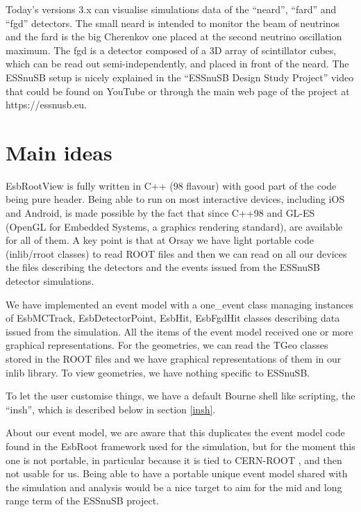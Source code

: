 \documentclass{webofc}
\begin{document}
Today's versions 3.x can visualise simulations data of the ``neard'',
``fard'' and ``fgd'' detectors. The small neard is intended to monitor the
beam of neutrinos and the fard is the big Cherenkov one
placed at the second neutrino oscillation maximum. The fgd is a detector
composed of a 3D array of scintillator cubes, which can be read out
semi-independently, and placed in front of the neard.
The ESSnuSB setup
is nicely explained in the ``ESSnuSB Design Study Project'' video that
could be found on YouTube or through the main web page of the project
at https://essnusb.eu.

\section{Main ideas}
EsbRootView is fully written in C++ (98 flavour) with good part of the code being
pure header. Being able to run on most interactive devices, including
iOS and Android, is made possible by the fact that since C++98 and GL-ES (OpenGL for Embedded
Systems, a graphics rendering standard), are available for all of them.
A key point is that at Orsay we have light portable code (inlib/rroot
classes) to read ROOT files and then we can read on all our devices the files describing the detectors and
the events issued from the ESSnuSB detector simulations.

We have implemented an event model with a one\_event class managing
instances of EsbMCTrack, EsbDetectorPoint, EsbHit, EsbFgdHit classes
describing data issued from the simulation. All the items of the event
model received one or more graphical representations. For the geometries, we can read the TGeo classes stored in the ROOT
files and we have graphical representations of them in our inlib
library. To view geometries, we have nothing specific to ESSnuSB.

To let the user customise things, we have a default Bourne shell like scripting, the
``insh'', which is described below in section \ref{insh}.

About our event model, we are aware that this duplicates
the event model code found in the EsbRoot framework used for the
simulation, but for the moment this one is not portable, in particular
because it is tied
to CERN-ROOT \cite{CERN-ROOT}, and then not usable for us. Being able
to have a portable unique event model shared with the simulation and analysis would be a
nice target to aim for the mid and long range term of the ESSnuSB project.
\end{document}
